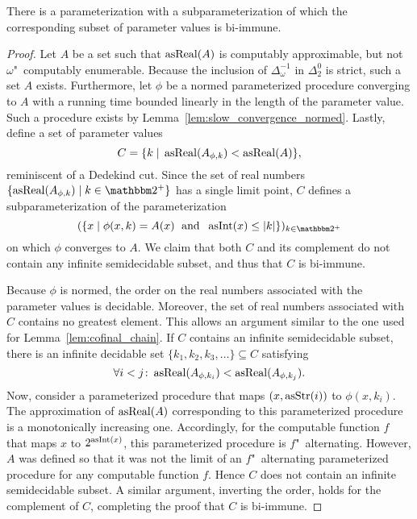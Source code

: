 \begin{lemma}
\label{lem:subparameterization_bi-immune}%
  There is a parameterization with a subparameterization of which the corresponding subset of parameter values is bi-immune.
\end{lemma}
\begin{proof}
  Let $A$ be a set such that $\operatorname{asReal}(A)$ is computably approximable, but not $\omega$"~computably enumerable.
  Because the inclusion of $\Delta^{-1}_\omega$ in $\Delta^0_2$ is strict, such a set $A$ exists.
  Furthermore, let $\phi$ be a normed parameterized procedure converging to $A$ with a running time bounded linearly in the length of the parameter value.
  Such a procedure exists by Lemma~\ref{lem:slow_convergence_normed}.
  Lastly, define a set of parameter values
  \begin{equation*}
    C = \{k \;|\; \operatorname{asReal}(A_{\phi,k}) < \operatorname{asReal}(A)\},
  \end{equation*}
  reminiscent of a Dedekind cut.
  Since the set of real numbers $\{\asReal(A_{\phi, k}) \st k \in \binary^+\}$ has a single limit point, $C$ defines a subparameterization of the parameterization
  \begin{equation*}
    (\{x \st \phi(x, k) = A(x) \reland \asNat(x) \le \length{k}\})_{k \in \binary^+}
  \end{equation*}
  on which $\phi$ converges to $A$.
  We claim that both $C$ and its complement do not contain any infinite semidecidable subset, and thus that $C$ is bi-immune.

  Because $\phi$ is normed, the order on the real numbers associated with the parameter values is decidable.
  Moreover, the set of real numbers associated with $C$ contains no greatest element.
  This allows an argument similar to the one used for Lemma~\ref{lem:cofinal_chain}.
  If $C$ contains an infinite semidecidable subset, there is an infinite decidable set $\{k_1, k_2, k_3, \ldots\} \subseteq C$ satisfying
  \begin{equation*}
    \forall i < j\colon \operatorname{asReal}(A_{\phi, k_i}) < \operatorname{asReal}(A_{\phi, k_j}).
  \end{equation*}
  Now, consider a parameterized procedure that maps $(x, \operatorname{asStr}(i))$ to $\phi(x, k_i)$.
  The approximation of $\operatorname{asReal}(A)$ corresponding to this parameterized procedure is a monotonically increasing one.
  Accordingly, for the computable function $f$ that maps $x$ to $2^{\operatorname{asInt}(x)}$, this parameterized procedure is $f$"~alternating.
  However, $A$ was defined so that it was not the limit of an $f$"~alternating parameterized procedure for any computable function $f$.
  Hence $C$ does not contain an infinite semidecidable subset.
  A similar argument, inverting the order, holds for the complement of $C$, completing the proof that $C$ is bi-immune.
\end{proof}

